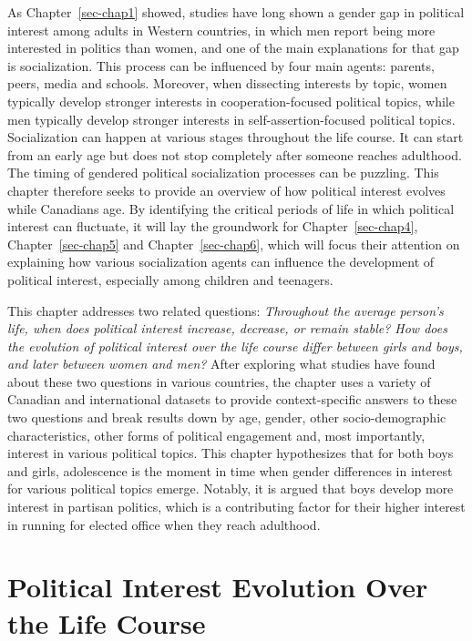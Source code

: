 \documentclass[
  letterpaper,
  DIV=11,
  numbers=noendperiod]{scrreprt}
\begin{document}
As Chapter~\ref{sec-chap1} showed, studies have long shown a gender gap
in political interest among adults in Western countries, in which men
report being more interested in politics than women, and one of the main
explanations for that gap is socialization. This process can be
influenced by four main agents: parents, peers, media and schools.
Moreover, when dissecting interests by topic, women typically develop
stronger interests in cooperation-focused political topics, while men
typically develop stronger interests in self-assertion-focused political
topics. Socialization can happen at various stages throughout the life
course. It can start from an early age but does not stop completely
after someone reaches adulthood. The timing of gendered political
socialization processes can be puzzling. This chapter therefore seeks to
provide an overview of how political interest evolves while Canadians
age. By identifying the critical periods of life in which political
interest can fluctuate, it will lay the groundwork for
Chapter~\ref{sec-chap4}, Chapter~\ref{sec-chap5} and
Chapter~\ref{sec-chap6}, which will focus their attention on explaining
how various socialization agents can influence the development of
political interest, especially among children and teenagers.

This chapter addresses two related questions: \emph{Throughout the
average person's life, when does political interest increase, decrease,
or remain stable? How does the evolution of political interest over the
life course differ between girls and boys, and later between women and
men?} After exploring what studies have found about these two questions
in various countries, the chapter uses a variety of Canadian and
international datasets to provide context-specific answers to these two
questions and break results down by age, gender, other socio-demographic
characteristics, other forms of political engagement and, most
importantly, interest in various political topics. This chapter
hypothesizes that for both boys and girls, adolescence is the moment in
time when gender differences in interest for various political topics
emerge. Notably, it is argued that boys develop more interest in
partisan politics, which is a contributing factor for their higher
interest in running for elected office when they reach adulthood.

\hypertarget{political-interest-evolution-over-the-life-course}{%
\section{Political Interest Evolution Over the Life
Course}\label{political-interest-evolution-over-the-life-course}}
\end{document}
